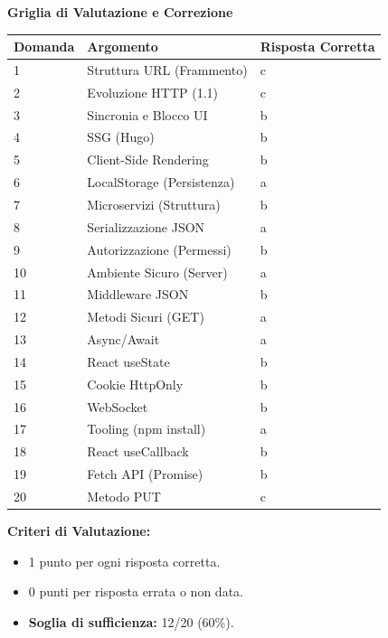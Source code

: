\documentclass[11pt,a4paper]{article}
\begin{document}
\newpage
{}

\vspace*{1cm}

\begin{center}
    {\Large \textbf{Griglia di Valutazione e Correzione}}
\end{center}

\vspace{1cm}

\begin{table}[ht]
\centering
\begin{tabularx}{\textwidth}{@{}|l|X|l|@{}}
\hline
\rowcolor{gray!20} \textbf{Domanda} & \textbf{Argomento} & \textbf{Risposta Corretta} \\ \hline
1 & Struttura URL (Frammento) & c \\ \hline
2 & Evoluzione HTTP (1.1) & c \\ \hline
3 & Sincronia e Blocco UI & b \\ \hline
4 & SSG (Hugo) & b \\ \hline
5 & Client-Side Rendering & b \\ \hline
6 & LocalStorage (Persistenza) & a \\ \hline
7 & Microservizi (Struttura) & b \\ \hline
8 & Serializzazione JSON & a \\ \hline
9 & Autorizzazione (Permessi) & b \\ \hline
10 & Ambiente Sicuro (Server) & a \\ \hline
11 & Middleware JSON & b \\ \hline
12 & Metodi Sicuri (GET) & a \\ \hline
13 & Async/Await & a \\ \hline
14 & React useState & b \\ \hline
15 & Cookie HttpOnly & b \\ \hline
16 & WebSocket & b \\ \hline
17 & Tooling (npm install) & a \\ \hline
18 & React useCallback & b \\ \hline
19 & Fetch API (Promise) & b \\ \hline
20 & Metodo PUT & c \\ \hline
\end{tabularx}
\end{table}

\vspace{1cm}
\textbf{Criteri di Valutazione:}
\begin{itemize}
    \item 1 punto per ogni risposta corretta.
    \item 0 punti per risposta errata o non data.
    \item \textbf{Soglia di sufficienza:} 12/20 (60\%).
\end{itemize}
\end{document}
